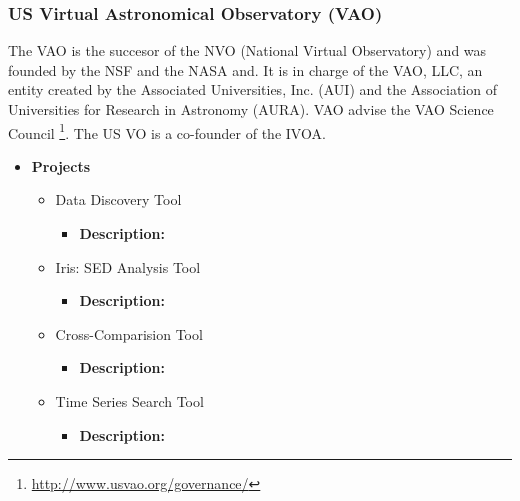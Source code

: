 \documentclass[11pt]{article}
\begin{document}
            \subsubsection{US Virtual Astronomical Observatory (VAO)}
                The VAO is the succesor of the NVO (National Virtual
Observatory) and was founded by the NSF and the NASA and. It is in charge of the
VAO, LLC, an entity created by the Associated Universities, Inc. (AUI) and the
Association of Universities for Research in Astronomy (AURA). VAO advise the VAO
Science Council \footnote{\url{http://www.usvao.org/governance/}}. The US VO is
a co-founder of the IVOA.

                \begin{itemize}
                    \item \textbf{Projects}
                        \begin{itemize}
                            \item Data Discovery Tool
                                \begin{itemize}
                                    \item \textbf{Description:} 
                                \end{itemize}
                            \item Iris: SED Analysis Tool
                                \begin{itemize}
                                    \item \textbf{Description:} 
                                \end{itemize}
                            \item Cross-Comparision Tool
                                \begin{itemize}
                                    \item \textbf{Description:} 
                                \end{itemize}
                            \item Time Series Search Tool
                                \begin{itemize}
                                    \item \textbf{Description:} 
                                \end{itemize}
                        \end{itemize}
                \end{itemize}
\end{document}
